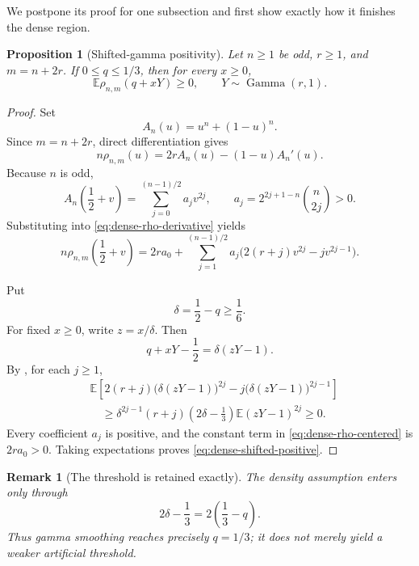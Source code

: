 \documentclass[11pt]{article}
\newtheorem{proposition}[theorem]{Proposition}
\newtheorem{remark}[theorem]{Remark}
\newcommand{\E}{\mathbb E}
\newcommand{\GammaLaw}{\operatorname{Gamma}}
\begin{document}
We postpone its proof for one subsection and first show exactly how it
finishes the dense region.

\begin{proposition}[Shifted-gamma positivity]\label{prop:dense-gamma-positive}
Let \(n\ge1\) be odd, \(r\ge1\), and \(m=n+2r\).  If \(0\le q\le1/3\), then
for every \(x\ge0\),
\begin{equation}\label{eq:dense-shifted-positive}
       \E\rho_{n,m}(q+xY)\ge0,
       \qquad Y\sim\GammaLaw(r,1).
\end{equation}
\end{proposition}

\begin{proof}
Set
\[
       A_n(u)=u^n+(1-u)^n.
\]
Since \(m=n+2r\), direct differentiation gives
\begin{equation}\label{eq:dense-rho-derivative}
       n\rho_{n,m}(u)=2rA_n(u)-(1-u)A_n'(u).
\end{equation}
Because \(n\) is odd,
\begin{equation}\label{eq:dense-even-expansion}
 A_n\left(\frac12+v\right)
 =\sum_{j=0}^{(n-1)/2}a_jv^{2j},
 \qquad
 a_j=2^{2j+1-n}\binom n{2j}>0.
\end{equation}
Substituting into \eqref{eq:dense-rho-derivative} yields
\begin{equation}\label{eq:dense-rho-centered}
 n\rho_{n,m}\left(\frac12+v\right)
 =2ra_0+
  \sum_{j=1}^{(n-1)/2}
  a_j\bigl(2(r+j)v^{2j}-jv^{2j-1}\bigr).
\end{equation}

Put
\[
       \delta=\frac12-q\ge\frac16.
\]
For fixed \(x\ge0\), write \(z=x/\delta\).  Then
\[
       q+xY-\frac12=\delta(zY-1).
\]
By , for each \(j\ge1\),
\begin{align*}
 &\E\left[
  2(r+j)\bigl(\delta(zY-1)\bigr)^{2j}
  -j\bigl(\delta(zY-1)\bigr)^{2j-1}
 \right]\\
 &\quad\ge
 \delta^{2j-1}(r+j)
 \left(2\delta-\frac13\right)
 \E(zY-1)^{2j}\ge0.
\end{align*}
Every coefficient \(a_j\) is positive, and the constant term in
\eqref{eq:dense-rho-centered} is \(2ra_0>0\).  Taking expectations proves
\eqref{eq:dense-shifted-positive}.
\end{proof}

\begin{remark}[The threshold is retained exactly]\label{rem:dense-threshold}
The density assumption enters only through
\[
       2\delta-\frac13=2\left(\frac13-q\right).
\]
Thus gamma smoothing reaches precisely \(q=1/3\); it does not merely yield a
weaker artificial threshold.
\end{remark}
\end{document}
